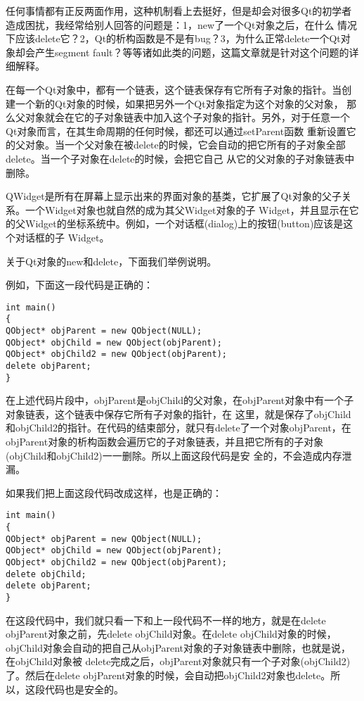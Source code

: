 任何事情都有正反两面作用，这种机制看上去挺好，但是却会对很多Qt的初学者造成困扰，我经常给别人回答的问题是：1，new了一个Qt对象之后，在什么 情况下应该delete它？2，Qt的析构函数是不是有bug？3，为什么正常delete一个Qt对象却会产生segment fault？等等诸如此类的问题，这篇文章就是针对这个问题的详细解释。

在每一个Qt对象中，都有一个链表，这个链表保存有它所有子对象的指针。当创建一个新的Qt对象的时候，如果把另外一个Qt对象指定为这个对象的父对象， 那么父对象就会在它的子对象链表中加入这个子对象的指针。另外，对于任意一个Qt对象而言，在其生命周期的任何时候，都还可以通过setParent函数 重新设置它的父对象。当一个父对象在被delete的时候，它会自动的把它所有的子对象全部delete。当一个子对象在delete的时候，会把它自己 从它的父对象的子对象链表中删除。

QWidget是所有在屏幕上显示出来的界面对象的基类，它扩展了Qt对象的父子关系。一个Widget对象也就自然的成为其父Widget对象的子 Widget，并且显示在它的父Widget的坐标系统中。例如，一个对话框(dialog)上的按钮(button)应该是这个对话框的子 Widget。

关于Qt对象的new和delete，下面我们举例说明。

例如，下面这一段代码是正确的：
\begin{lstlisting}
int main()
{
QObject* objParent = new QObject(NULL);
QObject* objChild = new QObject(objParent);
QObject* objChild2 = new QObject(objParent);
delete objParent;
}    
\end{lstlisting}
在上述代码片段中，objParent是objChild的父对象，在objParent对象中有一个子对象链表，这个链表中保存它所有子对象的指针，在 这里，就是保存了objChild和objChild2的指针。在代码的结束部分，就只有delete了一个对象objParent，在objParent对象的析构函数会遍历它的子对象链表，并且把它所有的子对象(objChild和objChild2)一一删除。所以上面这段代码是安 全的，不会造成内存泄漏。

如果我们把上面这段代码改成这样，也是正确的：
\begin{lstlisting}
int main()
{
QObject* objParent = new QObject(NULL);
QObject* objChild = new QObject(objParent);
QObject* objChild2 = new QObject(objParent);
delete objChild;
delete objParent;
}    
\end{lstlisting}

在这段代码中，我们就只看一下和上一段代码不一样的地方，就是在delete objParent对象之前，先delete objChild对象。在delete objChild对象的时候，objChild对象会自动的把自己从objParent对象的子对象链表中删除，也就是说，在objChild对象被 delete完成之后，objParent对象就只有一个子对象(objChild2)了。然后在delete objParent对象的时候，会自动把objChild2对象也delete。所以，这段代码也是安全的。

